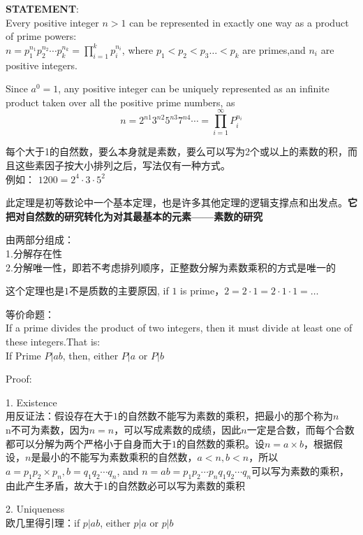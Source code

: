 \documentclass[../main.tex]{subfiles}
\begin{document}
\begin{mdframed}
\textbf{STATEMENT}:\\
Every positive integer $n>1$ can be represented in exactly one way as a product of prime powers:\\
$ n = p_1^{n_1}p_2^{n_2}\cdots p_k^{n_k} = \prod_{i=1}^kp_i^{n_i}$, where $p_1<p_2<p_3\ldots <p_k$ are primes,and $n_i$ are positive integers.
\end{mdframed}
Since $a^0=1$, any positive integer can be uniquely represented as an infinite product taken over all the positive prime numbers, as
\[
n = 2^{n1}3^{n2}5^{n3}7^{n4}\cdots = \prod_{i=1}^{\infty}P_i^{n_i}
\]

每个大于1的自然数，要么本身就是素数，要么可以写为2个或以上的素数的积，而且这些素因子按大小排列之后，写法仅有一种方式。\\
例如： $ 1200 = 2^4\cdot 3 \cdot 5^2$

此定理是初等数论中一个基本定理，也是许多其他定理的逻辑支撑点和出发点。\textbf{它把对自然数的研究转化为对其最基本的元素——素数的研究}

由两部分组成：\\
1.分解存在性\\
2.分解唯一性，即若不考虑排列顺序，正整数分解为素数乘积的方式是唯一的

这个定理也是$1$不是质数的主要原因, if $1$ is prime，$2=2\cdot 1=2\cdot 1\cdot 1=\ldots $

等价命题：\\
If a prime divides the product of two integers, then it must divide at least one of these integers.That is:\\
If Prime $P|ab$, then, either $P|a$ or $P|b$ 

Proof:

1. Existence\\
用反证法：假设存在大于$1$的自然数不能写为素数的乘积，把最小的那个称为$n$\\
n不可为素数，因为$n=n$，可以写成素数的成绩，因此$n$一定是合数，而每个合数都可以分解为两个严格小于自身而大于$1$的自然数的乘积。设$n=a\times b$，根据假设，$n$是最小的不能写为素数乘积的自然数，$a<n, b<n$，所以$a=p_1p_2\times p_n, b=q_1q_2\cdots q_n$, and $n=ab=p_1p_2\cdots p_nq_1q_2\cdots q_n$可以写为素数的乘积，由此产生矛盾，故大于$1$的自然数必可以写为素数的乘积

2. Uniqueness\\
欧几里得引理：if $p|ab$, either $p|a$ or $p|b$

\end{document}
